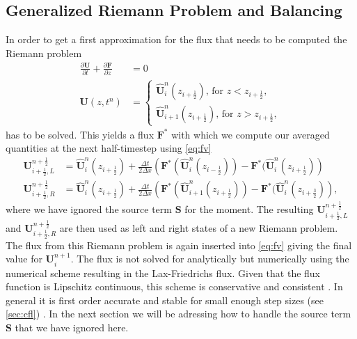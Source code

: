 \documentclass[a4paper, oneside]{discothesis}
\begin{document}
\subsection{Generalized Riemann Problem and Balancing} \label{ssec:grp}
In order to get a first approximation for the flux that needs to be computed the Riemann problem
\begin{align}
	\frac{\partial \mathbf{U}}{\partial t} + \frac{\partial \mathbf{F}}{\partial z} &= 0 \\
	\mathbf{U}(z,t^n) &= \left\{
		\begin{array}{c}
			\mathbf{\hat{U}}_i^n(z_{i+\frac{1}{2}}) \text{, for } z < z_{i+\frac{1}{2}}, \\
			\mathbf{\hat{U}}_{i+1}^n(z_{i+\frac{1}{2}}) \text{, for } z > z_{i+\frac{1}{2}},
	\end{array} \right.  
\end{align}
has to be solved.
This yields a flux $\mathbf{F^*}$ with which we compute our averaged quantities at the next half-timestep using \autoref{eq:fv}
\begin{align}
	\mathbf{U}_{i+\frac{1}{2},L}^{n+\frac{1}{2}} &= \mathbf{\hat{U}}_i^n(z_{i+\frac{1}{2}}) + \frac{\Delta t}{2 \Delta x} \left( \mathbf{F^*}(\mathbf{\hat{U}}_i^n( z_{i-\frac{1}{2}})) - \mathbf{F^*}(\mathbf{\hat{U}}_i^n(z_{i+\frac{1}{2}}) \right)\\
	\mathbf{U}_{i+\frac{1}{2},R}^{n+\frac{1}{2}} &= \mathbf{\hat{U}}_i^n(z_{i+\frac{1}{2}}) + \frac{\Delta t}{2 \Delta x} \left( \mathbf{F^*}(\mathbf{\hat{U}}_{i+1}^n( z_{i+\frac{1}{2}})) - \mathbf{F^*}(\mathbf{\hat{U}}_i^n(z_{i+\frac{3}{2}}) \right),
\end{align}
where we have ignored the source term $\mathbf{S}$ for the moment.
The resulting $\mathbf{U}_{i+\frac{1}{2},L}^{n+\frac{1}{2}}$ and $\mathbf{U}_{i+\frac{1}{2},R}^{n+\frac{1}{2}}$ are then used as left and right states of a new Riemann problem.
The flux from this Riemann problem is again inserted into \autoref{eq:fv} giving the final value for $\mathbf{U}_i^{n+1}$.
The flux is not solved for analytically but numerically using the numerical scheme resulting in the Lax-Friedrichs flux.
Given that the flux function is Lipschitz continuous, this scheme is conservative and consistent \cite{koppl2023dimension}.
In general it is first order accurate and stable for small enough step sizes (see \autoref{sec:cfl}) \cite{leveque1992numerical}.
In the next section we will be adressing how to handle the source term $\mathbf{S}$ that we have ignored here.
\end{document}
